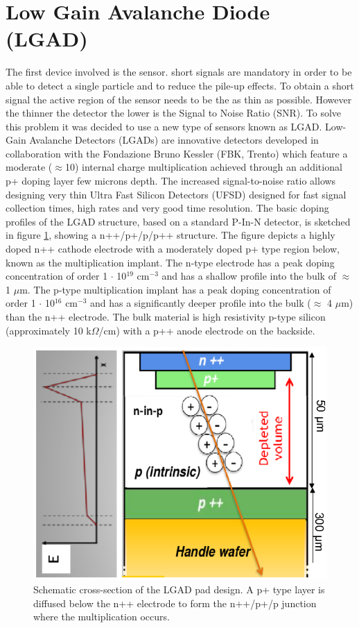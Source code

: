 \section{Low Gain Avalanche Diode (LGAD)}\label{lgad}
\noindent The first device involved is the sensor.
short signals are mandatory in order to be able to detect a single particle and to reduce the pile-up effects.
To obtain a short signal the active region of the sensor needs to be the as thin as possible. However the thinner the detector the lower is the Signal to Noise Ratio (SNR).
To solve this problem it was decided to use a new type of sensors known as LGAD.
\noindent Low-Gain Avalanche Detectors (LGADs) are innovative detectors developed in collaboration with the Fondazione Bruno Kessler (FBK, Trento) which feature a moderate ($\approx$10) internal charge multiplication achieved through an additional p+ doping layer few microns depth. The increased signal-to-noise ratio allows designing very thin Ultra Fast Silicon Detectors (UFSD) designed for fast signal collection times, high rates and very good time resolution\cite{lgad}.
The basic doping profiles of the LGAD structure, based on a standard P-In-N detector, is sketched in figure \ref{fig:ufsdlgad}, showing a n++/p+/p/p++ structure.
The figure depicts a highly doped n++ cathode electrode with a moderately doped p+ type region
below, known as the multiplication implant. The n-type electrode has a peak doping concentration
of order 1 $\cdot$ 10$^{19}$ cm$^{-3}$ and has a shallow profile into the bulk of $\approx$ 1 $\mu$m.
The p-type multiplication implant has a peak doping concentration of order 1 $\cdot$ 10$^{16}$ cm$^{-3}$
and has a significantly deeper profile into the bulk ($\approx$ 4 $\mu$m) than the n++ electrode. The bulk
material is high resistivity p-type silicon (approximately 10 k$\Omega$/cm) with a p++ anode electrode
on the backside.
\begin{figure}[H]
	\centering
	\includegraphics[width=0.35\linewidth]{IMG/ch2/UFSDLGAD.png}
	\caption{Schematic cross-section of the LGAD pad design. A p+ type layer is diffused below the n++ electrode to form the n++/p+/p junction where the multiplication occurs\cite{lgad2}.}
	\label{fig:ufsdlgad}
\end{figure}
